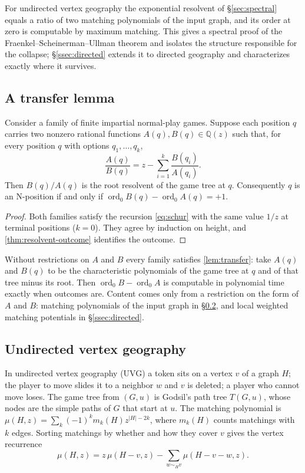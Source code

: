 \documentclass[final]{siamart0516}
\numberwithin{theorem}{section}
\numberwithin{equation}{section}
\theoremstyle{siamnonum}
\renewenvironment{remark*}{\remarkstar}{\endremarkstar}
\theoremstyle{plain}
\newcommand{\QQ}{\mathbb{Q}}
\newcommand{\Qz}{\QQ(z)}
\newcommand{\ord}{\operatorname{ord}}
\begin{document}
For undirected vertex geography the exponential resolvent of \S\ref{sec:spectral} equals a ratio of two matching polynomials of the input graph, and its order at zero is computable by maximum matching. This gives a spectral proof of the Fraenkel--Scheinerman--Ullman theorem and isolates the structure responsible for the collapse; \S\ref{ssec:directed} extends it to directed geography and characterizes exactly where it survives.

\subsection{A transfer lemma}
\begin{lemma}[transfer]\label{lem:transfer}
Consider a family of finite impartial normal-play games. Suppose each position $q$ carries two nonzero rational functions $A(q),B(q)\in\Qz$ such that, for every position $q$ with options $q_1,\dots,q_k$,
\[
\frac{A(q)}{B(q)}=z-\sum_{i=1}^k\frac{B(q_i)}{A(q_i)}.
\]
Then $B(q)/A(q)$ is the root resolvent of the game tree at $q$. Consequently $q$ is an N-position if and only if $\ord_0B(q)-\ord_0A(q)=+1$.
\end{lemma}
\begin{proof}
Both families satisfy the recursion \eqref{eq:schur} with the same value $1/z$ at terminal positions ($k=0$). They agree by induction on height, and \cref{thm:resolvent-outcome} identifies the outcome.
\end{proof}

\begin{remark*}
Without restrictions on $A$ and $B$ every family satisfies \cref{lem:transfer}: take $A(q)$ and $B(q)$ to be the characteristic polynomials of the game tree at $q$ and of that tree minus its root. Then $\ord_0B-\ord_0A$ is computable in polynomial time exactly when outcomes are. Content comes only from a restriction on the form of $A$ and $B$: matching polynomials of the input graph in \S\ref{ssec:uvg}, and local weighted matching potentials in \S\ref{ssec:directed}.
\end{remark*}

\subsection{Undirected vertex geography}\label{ssec:uvg}
In undirected vertex geography (UVG) a token sits on a vertex $v$ of a graph $H$; the player to move slides it to a neighbor $w$ and $v$ is deleted; a player who cannot move loses. The game tree from $(G,u)$ is Godsil's path tree $T(G,u)$, whose nodes are the simple paths of $G$ that start at $u$. The matching polynomial is $\mu(H,z)=\sum_k(-1)^km_k(H)z^{|H|-2k}$, where $m_k(H)$ counts matchings with $k$ edges. Sorting matchings by whether and how they cover $v$ gives the vertex recurrence
\begin{equation}\label{eq:vertex-recurrence}
\mu(H,z)=z\,\mu(H-v,z)-\sum_{w\sim_Hv}\mu(H-v-w,z).
\end{equation}
\end{document}

